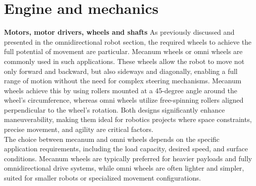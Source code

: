 \documentclass{article}
\begin{document}
\newpage
\section{Engine and mechanics} %
\textbf{Motors, motor drivers, wheels and shafts}
As previously discussed and presented in the omnidirectional robot section, the required wheels to achieve the full potential of movement are particular. Mecanum wheels or omni wheels are commonly used in such applications. These wheels allow the robot to move not only forward and backward, but also sideways and diagonally, enabling a full range of motion without the need for complex steering mechanisms. Mecanum wheels achieve this by using rollers mounted at a 45-degree angle around the wheel's circumference, whereas omni wheels utilize free-spinning rollers aligned perpendicular to the wheel's rotation. Both designs significantly enhance maneuverability, making them ideal for robotics projects where space constraints, precise movement, and agility are critical factors.
\\

The choice between mecanum and omni wheels depends on the specific application requirements, including the load capacity, desired speed, and surface conditions. Mecanum wheels are typically preferred for heavier payloads and fully omnidirectional drive systems, while omni wheels are often lighter and simpler, suited for smaller robots or specialized movement configurations.
\\
\end{document}
